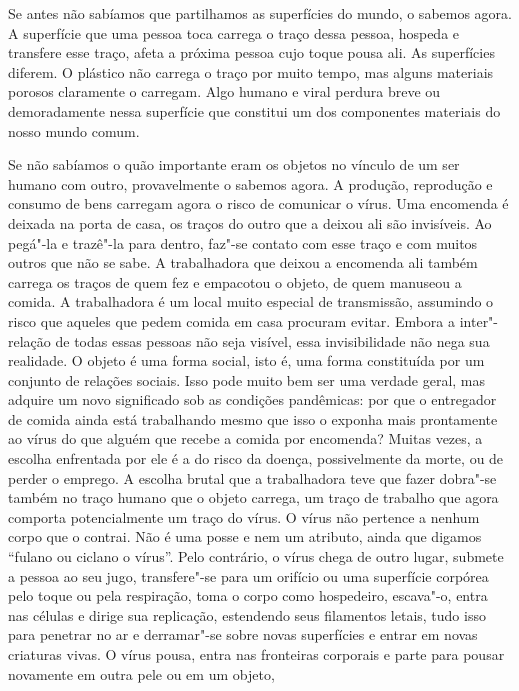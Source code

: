 \begin{multicols}{2}
Se antes não sabíamos que partilhamos as superfícies do mundo, o sabemos
agora. A superfície que uma pessoa toca carrega o traço dessa pessoa,
hospeda e transfere esse traço, afeta a próxima pessoa cujo toque pousa
ali. As superfícies diferem. O plástico não carrega o traço por muito
tempo, mas alguns materiais porosos claramente o carregam. Algo humano e
viral perdura breve ou demoradamente nessa superfície que constitui um
dos componentes materiais do nosso mundo comum.

Se não sabíamos o quão importante eram os objetos no vínculo de um ser
humano com outro, provavelmente o sabemos agora. A produção, reprodução
e consumo de bens carregam agora o risco de comunicar o vírus. Uma
encomenda é deixada na porta de casa, os traços do outro que a deixou
ali são invisíveis. Ao pegá"-la e trazê"-la para dentro, faz"-se contato
com esse traço e com muitos outros que não se sabe. A trabalhadora que
deixou a encomenda ali também carrega os traços de quem fez e empacotou
o objeto, de quem manuseou a comida. A trabalhadora é um local muito
especial de transmissão, assumindo o risco que aqueles que pedem comida
em casa procuram evitar. Embora a inter"-relação de todas essas pessoas
não seja visível, essa invisibilidade não nega sua realidade.
O objeto é
uma forma social, isto é, uma forma constituída por um conjunto de
relações sociais. Isso pode muito bem ser uma verdade geral, mas adquire
um novo significado sob as condições pandêmicas: por que o entregador de
comida ainda está trabalhando mesmo que isso o exponha mais prontamente
ao vírus do que alguém que recebe a comida por encomenda? Muitas vezes,
a escolha enfrentada por ele é a do risco da doença, possivelmente da
morte, ou de perder o emprego. A escolha brutal que a trabalhadora teve
que fazer dobra"-se também no traço humano que o objeto carrega, um traço
de trabalho que agora comporta potencialmente um traço do vírus. O vírus
não pertence a nenhum corpo que o contrai. Não é uma posse e nem um
atributo, ainda que digamos ``fulano ou ciclano {} o vírus''.
Pelo contrário, o vírus chega de outro lugar, submete a pessoa ao seu
jugo, transfere"-se para um orifício ou uma superfície corpórea pelo
toque ou pela respiração, toma o corpo como hospedeiro, escava"-o, entra
nas células e dirige sua replicação, estendendo seus filamentos letais,
tudo isso para penetrar no ar e derramar"-se sobre novas superfícies e
entrar em novas criaturas vivas. O vírus pousa, entra
nas fronteiras
corporais e parte para pousar novamente em outra pele ou em um objeto,

\end{multicols}

